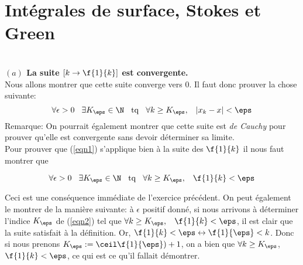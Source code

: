 
\setcounter{CountExercice}{1}




\section{Intégrales de surface, Stokes et Green}




\setcounter{CountExercice}{0}


\\

{\bf $(a)$ La suite $[k\rightarrow \f{1}{k}]$ est convergente.}\\

\noindent Nous allons montrer que cette suite converge vers $0$. Il faut donc prouver la chose suivante: 
   \begin{equation}\label{eqn1}\forall \epsilon >0 \hspace{0,3cm} \exists K_\eps \in \N \hspace{0,3cm} {\rm tq}  \hspace{0,3cm}  \forall k\geq K_\eps, \hspace{0,3cm}  |x_k-x|<\eps\end{equation}
{Remarque}: On pourrait également montrer que cette suite est {\it de Cauchy} pour prouver qu'elle est convergente sans devoir déterminer sa limite.\\

\noindent Pour prouver que (\ref{eqn1}) s'applique bien à la suite des $\f{1}{k}$ il nous faut montrer que

   \begin{equation}\label{eqn2}\forall \epsilon >0 \hspace{0,3cm} \exists K_\eps \in \N \hspace{0,3cm} {\rm tq}  \hspace{0,3cm}  \forall k\geq K_\eps,  \hspace{0,3cm} \f{1}{k}<\eps\end{equation}

\noindent Ceci est une conséquence immédiate de l'exercice précédent. On peut également le montrer de la manière suivante: à $\epsilon$ positif donné, si nous arrivons à déterminer l'indice $K_\eps$ de (\ref{eqn2}) tel que $\forall k\geq K_\eps,  \hspace{0,3cm} \f{1}{k}<\eps$, il est clair que la suite satisfait à la définition. Or, $\f{1}{k} < \eps \leftrightarrow \f{1}{\eps} <k$. Donc si nous prenons $K_\eps := \ceil\f{1}{\eps})+1$, on a bien que $\forall k\geq K_\eps$, $\f{1}{k}<\eps$, ce qui est ce qu'il fallait démontrer.


